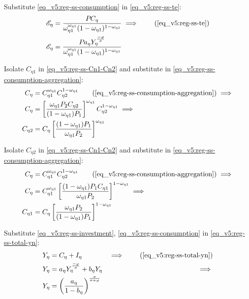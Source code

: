 \documentclass[../thesis.tex]{subfiles}
\begin{document}
	Substitute \ref{eq_v5:reg-ss-consumption} in \ref{eq_v5:reg-ss-te}:
	\begin{align}
		\te[] &= \frac{P_{} C_{\eta}}{\omega_{\eta 1}^{\omega_{\eta 1}} (1 -\omega_{\eta 1})^{1 -\omega_{\eta 1}}} \implies \tag{\ref{eq_v5:reg-ss-te}} \\
		\te[] &= \frac{P_{} a_{\eta} Y_{\eta}^{\frac{-\varphi}{\sigma}}}{\omega_{\eta 1}^{\omega_{\eta 1}} (1 -\omega_{\eta 1})^{1 -\omega_{\eta 1}}} \label{eq_v5:reg-ss-te-2}
	\end{align}


Isolate $C_{\eta 1}$ in \ref{eq_v5:reg-ss-Cn1-Cn2} and substitute in \ref{eq_v5:reg-ss-consumption-aggregation}:
\begin{align}
	C_{\eta} &= C_{\eta 1}^{\omega_{\eta 1}} C_{\eta 2}^{1-\omega_{\eta 1}} \tag{\ref{eq_v5:reg-ss-consumption-aggregation}} \implies \\
	C_{\eta} &= \left[ \frac{\omega_{\eta 1} P_{2} C_{\eta 2}}{(1 -\omega_{\eta 1}) P_{1}} \right]^{\omega_{\eta 1}} C_{\eta 2}^{1-\omega_{\eta 1}} \implies \nonumber \\
	C_{\eta 2} &= C_{\eta} \left[ \frac{(1 - \omega_{\eta 1}) P_{1}}{\omega_{\eta 1} P_{2}} \right]^{\omega_{\eta 1}} \label{eq_v5:reg-ss-C2-Cn-3}
\end{align}

Isolate $C_{\eta 2}$ in \ref{eq_v5:reg-ss-Cn1-Cn2} and substitute in \ref{eq_v5:reg-ss-consumption-aggregation}:
\begin{align}
	C_{\eta} &= C_{\eta 1}^{\omega_{\eta 1}} C_{\eta 2}^{1-\omega_{\eta 1}} \tag{\ref{eq_v5:reg-ss-consumption-aggregation}} \implies \\
	C_{\eta} &= C_{\eta 1}^{\omega_{\eta 1}} \left[ \frac{(1 -\omega_{\eta 1}) P_{1} C_{\eta 1}}{\omega_{\eta 1} P_{2}} \right]^{1-\omega_{\eta 1}} \implies \nonumber \\
	C_{\eta 1} &= C_{\eta} \left[ \frac{\omega_{\eta 1} P_{2}}{(1 - \omega_{\eta 1}) P_{1}} \right]^{1-\omega_{\eta 1}} \label{eq_v5:reg-ss-C1-Cn-3}
\end{align}


Substitute \ref{eq_v5:reg-ss-investment}, \ref{eq_v5:reg-ss-consumption} in \ref{eq_v5:reg-ss-total-yn}:
	\begin{alignat}{2}
		Y_{\eta} &= C_{\eta} + I_{\eta} &\implies \tag{\ref{eq_v5:reg-ss-total-yn}} \\
		Y_{\eta} &= a_{\eta} Y_{\eta}^{\frac{-\varphi}{\sigma}} + b_{\eta} Y_{\eta} &\implies \nonumber \\
		Y_{\eta} &= \left( \frac{a_{\eta}}{1 - b_{\eta}} \right)^{\frac{\sigma}{\sigma + \varphi}} \label{eq_v5:reg-ss-total-yn-2}
	\end{alignat}
\end{document}
